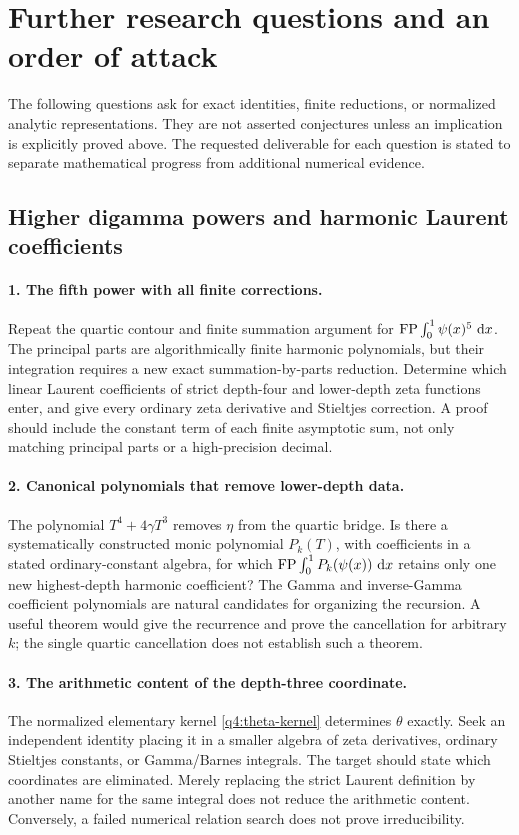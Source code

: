 \section{Further research questions and an order of attack}
\label{research:section}

The following questions ask for exact identities, finite reductions,
or normalized analytic representations. They are not asserted
conjectures unless an implication is explicitly proved above.
The requested deliverable for each question is stated to separate
mathematical progress from additional numerical evidence.

\subsection{Higher digamma powers and harmonic Laurent coefficients}

\paragraph{1. The fifth power with all finite corrections.}
Repeat the quartic contour and finite summation argument for
$\operatorname{FP}\int_0^1\psi(x)^5\,\mathop{}\!\mathrm{d} x$. The principal parts are
algorithmically finite harmonic polynomials, but their integration
requires a new exact summation-by-parts reduction. Determine
which linear Laurent coefficients of strict depth-four and
lower-depth zeta functions enter, and give every ordinary zeta
derivative and Stieltjes correction. A proof should include the
constant term of each finite asymptotic sum, not only matching
principal parts or a high-precision decimal.

\paragraph{2. Canonical polynomials that remove lower-depth data.}
The polynomial $T^4+4\gamma T^3$ removes $\eta$ from the quartic
bridge. Is there a systematically constructed monic polynomial
$P_k(T)$, with coefficients in a stated ordinary-constant algebra,
for which $\operatorname{FP}\int_0^1P_k(\psi(x))\,\mathop{}\!\mathrm{d} x$ retains only one
new highest-depth harmonic coefficient? The Gamma and inverse-Gamma
coefficient polynomials are natural candidates for organizing the
recursion. A useful theorem would give the recurrence and prove
the cancellation for arbitrary $k$; the single quartic cancellation
does not establish such a theorem.

\paragraph{3. The arithmetic content of the depth-three coordinate.}
The normalized elementary kernel \eqref{q4:theta-kernel} determines
$\theta$ exactly. Seek an independent identity placing it in a
smaller algebra of zeta derivatives, ordinary Stieltjes constants,
or Gamma/Barnes integrals. The target should state which coordinates
are eliminated. Merely replacing the strict Laurent definition
by another name for the same integral does not reduce the
arithmetic content. Conversely, a failed numerical relation search
does not prove irreducibility.

